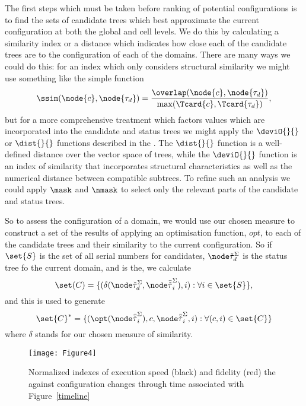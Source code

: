 The first steps which must be taken before ranking of potential
configur\-ations is to find the sets of candidate trees which best
approximate the current con\-fig\-ur\-a\-tion at both the global and
cell levels. We do this by calculating a similarity index or a
distance which indicates how close each of the candidate trees are to
the configur\-ation of each of the domains. There are many ways we
could do this: for an index which only considers structural similarity
we might use something like the simple function
\begin{equation*}
  \ssim(\node{c},\node{\tau_d}) =
  \frac{\overlap(\node{c},\node{\tau_d})}{\max(\Tcard{c},\Tcard{\tau_d})}, 
\end{equation*}
but for a more comprehensive treatment which factors values which are
incorporated into the candidate and status trees we might apply the
$\deviO{}{}$ or $\dist{}{}$ functions described in the \appendixname. The
$\dist{}{}$ function is a well-defined distance over the vector space of
trees, while the $\deviO{}{}$ function is an index of similarity that
incorporates structural characteristics as well as the numerical
distance between compatible subtrees.  To refine such an analysis we could apply
$\mask$ and $\nmask$ to select only the relevant parts of the
candidate and status trees.

So to assess the con\-fig\-ur\-a\-tion of a domain, we would use our chosen
measure to construct a set of the results of applying an optimisation
function, $opt$, to each of the candidate trees and their similarity
to the current con\-fig\-ur\-a\-tion.  So if $\set{S}$ is the set of all
serial numbers for candidates, $\domt{d}$ is the status tree fo the
current domain, and  is the, we calculate
\begin{equation*}
  \set(C) = \{(\delta(\domt{d},\cst{i}),i): \forall i \in \set{S}\},
\end{equation*}
and this is used to generate
\begin{equation*}
  \set{C}^* = \{(\opt(\cst{i}),c,\cst{i},i): \forall(c,i) \in \set{C}\}
\end{equation*}
where $\delta$ stands for our chosen measure of similarity.

\begin{figure}\label{indices}
\begin{center}
  \texttt{[image: Figure4]}
  \caption{Normalized indexes of execution speed (black) and fidelity (red) the 
    against configuration changes through time associated with Figure~\ref{timeline}}
\end{center}
\end{figure}

